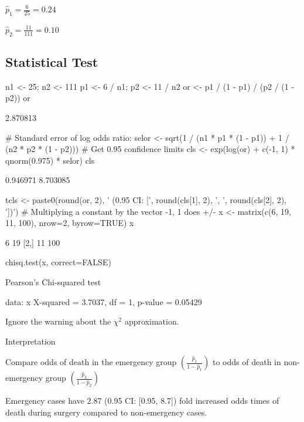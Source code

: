 \bi
\item $\hat{p}_1 = \frac{6}{25} = 0.24$
\item $\hat{p}_2 = \frac{11}{111} = 0.10$
\ei

\subsection{Statistical Test}
\begin{Schunk}
\begin{Sinput}
n1 <- 25;     n2 <- 111
p1 <- 6 / n1; p2 <- 11 / n2
or <- p1 / (1 - p1) / (p2 / (1 - p2))
or
\end{Sinput}
\begin{Soutput}
[1] 2.870813
\end{Soutput}
\begin{Sinput}
# Standard error of log odds ratio:
selor <- sqrt(1 / (n1 * p1 * (1 - p1)) + 1 / (n2 * p2 * (1 - p2)))
# Get 0.95 confidence limits
cls <- exp(log(or) + c(-1, 1) * qnorm(0.975) * selor)
cls
\end{Sinput}
\begin{Soutput}
[1] 0.946971 8.703085
\end{Soutput}
\begin{Sinput}
tcls <- paste0(round(or, 2), ' (0.95 CI: [', round(cls[1], 2),
               ', ', round(cls[2], 2), '])')
# Multiplying a constant by the vector -1, 1 does +/-
x <- matrix(c(6, 19, 11, 100), nrow=2, byrow=TRUE)
x
\end{Sinput}
\begin{Soutput}
     [,1] [,2]
[1,]    6   19
[2,]   11  100
\end{Soutput}
\begin{Sinput}
chisq.test(x, correct=FALSE)
\end{Sinput}
\begin{Soutput}

	Pearson's Chi-squared test

data:  x
X-squared = 3.7037, df = 1, p-value = 0.05429
\end{Soutput}
\end{Schunk}
Ignore the warning about the $\chi^2$ approximation.
\bi
\item Interpretation
 \bi
 \item Compare odds of death in the emergency group
   $\left(\frac{\hat{p}_1}{1-\hat{p}_1}\right)$ to odds of death in
   non-emergency group  $\left(\frac{\hat{p}_2}{1-\hat{p}_2}\right)$ 
 \item Emergency cases have 2.87 (0.95 CI: [0.95, 8.7]) fold
   increased odds times of death during surgery compared to
   non-emergency cases. 
 \ei
\ei

